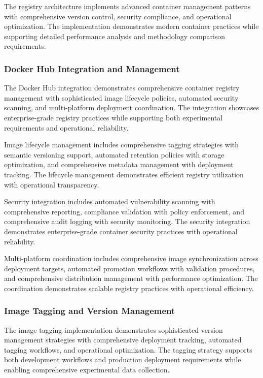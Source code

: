 The registry architecture implements advanced container management patterns with comprehensive version control, security compliance, and operational optimization. The implementation demonstrates modern container practices while supporting detailed performance analysis and methodology comparison requirements.

\subsubsection{Docker Hub Integration and Management}

The Docker Hub integration demonstrates comprehensive container registry management with sophisticated image lifecycle policies, automated security scanning, and multi-platform deployment coordination. The integration showcases enterprise-grade registry practices while supporting both experimental requirements and operational reliability.

Image lifecycle management includes comprehensive tagging strategies with semantic versioning support, automated retention policies with storage optimization, and comprehensive metadata management with deployment tracking. The lifecycle management demonstrates efficient registry utilization with operational transparency.

Security integration includes automated vulnerability scanning with comprehensive reporting, compliance validation with policy enforcement, and comprehensive audit logging with security monitoring. The security integration demonstrates enterprise-grade container security practices with operational reliability.

Multi-platform coordination includes comprehensive image synchronization across deployment targets, automated promotion workflows with validation procedures, and comprehensive distribution management with performance optimization. The coordination demonstrates scalable registry practices with operational efficiency.

\subsubsection{Image Tagging and Version Management}

The image tagging implementation demonstrates sophisticated version management strategies with comprehensive deployment tracking, automated tagging workflows, and operational optimization. The tagging strategy supports both development workflows and production deployment requirements while enabling comprehensive experimental data collection.

